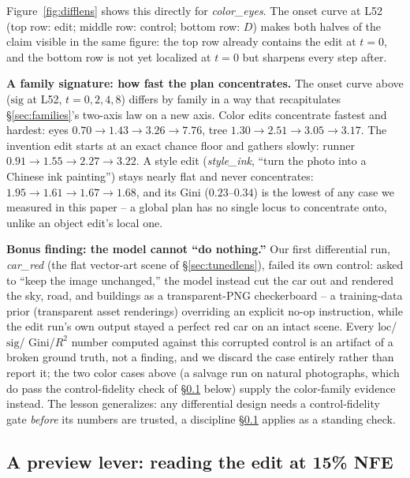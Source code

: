 \documentclass[10pt,twocolumn,letterpaper]{article}
\begin{document}
Figure~\ref{fig:difflens} shows this directly for \emph{color\_eyes}.
The onset curve at L52 (top row: edit; middle row: control; bottom row:
$D$) makes both halves of the claim visible in the same figure: the
top row already contains the edit at $t{=}0$, and the bottom row is not yet
localized at $t{=}0$ but sharpens every step after.

\textbf{A family signature: how fast the plan concentrates.} The onset
curve above ($\mathrm{sig}$ at L52, $t{=}0,2,4,8$) differs by family in
a way that recapitulates \S\ref{sec:families}'s two-axis law on a new
axis. Color edits concentrate fastest and hardest: eyes
$0.70\to1.43\to3.26\to7.76$, tree $1.30\to2.51\to3.05\to3.17$. The
invention edit starts at an exact chance floor and gathers slowly:
runner $0.91\to1.55\to2.27\to3.22$. A style edit (\emph{style\_ink},
``turn the photo into a Chinese ink painting'') stays nearly flat and
never concentrates: $1.95\to1.61\to1.67\to1.68$, and its Gini
($0.23$--$0.34$) is the lowest of any case we measured in this
paper -- a global plan has no single locus to concentrate onto, unlike
an object edit's local one.

\textbf{Bonus finding: the model cannot ``do nothing.''} Our first
differential run, \emph{car\_red} (the flat vector-art scene of
\S\ref{sec:tunedlens}), failed its own control: asked to ``keep the
image unchanged,'' the model instead cut the car out and rendered the
sky, road, and buildings as a transparent-PNG checkerboard -- a
training-data prior (transparent asset renderings) overriding an
explicit no-op instruction, while the edit run's own output stayed a
perfect red car on an intact scene. Every $\mathrm{loc}$/$\mathrm{sig}$/
Gini/$R^2$ number computed against this corrupted control is an
artifact of a broken ground truth, not a finding, and we discard the
case entirely rather than report it; the two color cases above (a
salvage run on natural photographs, which do pass the control-fidelity
check of \S\ref{sec:previewlever} below) supply the color-family
evidence instead. The lesson generalizes: any differential design needs
a control-fidelity gate \emph{before} its numbers are trusted, a
discipline \S\ref{sec:previewlever} applies as a standing check.

\subsection{A preview lever: reading the edit at 15\% NFE}\label{sec:previewlever}
\end{document}
